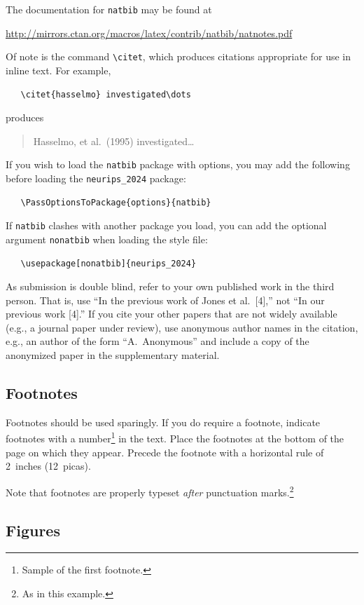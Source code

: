 \documentclass{article}
\begin{document}
The documentation for \verb+natbib+ may be found at
\begin{center}
  \url{http://mirrors.ctan.org/macros/latex/contrib/natbib/natnotes.pdf}
\end{center}
Of note is the command \verb+\citet+, which produces citations appropriate for
use in inline text.  For example,
\begin{verbatim}
   \citet{hasselmo} investigated\dots
\end{verbatim}
produces
\begin{quote}
  Hasselmo, et al.\ (1995) investigated\dots
\end{quote}


If you wish to load the \verb+natbib+ package with options, you may add the
following before loading the \verb+neurips_2024+ package:
\begin{verbatim}
   \PassOptionsToPackage{options}{natbib}
\end{verbatim}


If \verb+natbib+ clashes with another package you load, you can add the optional
argument \verb+nonatbib+ when loading the style file:
\begin{verbatim}
   \usepackage[nonatbib]{neurips_2024}
\end{verbatim}


As submission is double blind, refer to your own published work in the third
person. That is, use ``In the previous work of Jones et al.\ [4],'' not ``In our
previous work [4].'' If you cite your other papers that are not widely available
(e.g., a journal paper under review), use anonymous author names in the
citation, e.g., an author of the form ``A.\ Anonymous'' and include a copy of the anonymized paper in the supplementary material.


\subsection{Footnotes}


Footnotes should be used sparingly.  If you do require a footnote, indicate
footnotes with a number\footnote{Sample of the first footnote.} in the
text. Place the footnotes at the bottom of the page on which they appear.
Precede the footnote with a horizontal rule of 2~inches (12~picas).


Note that footnotes are properly typeset \emph{after} punctuation
marks.\footnote{As in this example.}


\subsection{Figures}
\end{document}
